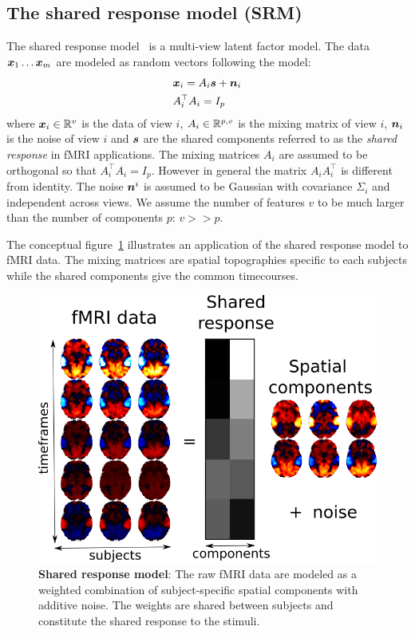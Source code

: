 \subsection{The shared response model (SRM)}
\label{sec:srm:review}
The shared response model~\cite{chen2015reduced} is a multi-view latent factor
model. The data $\boldsymbol{x}_1 \dots \boldsymbol{x}_m$ are modeled as random vectors following the model:
\begin{align}
 &\boldsymbol{x}_i = A_i \boldsymbol{s} + \boldsymbol{n}_i \\
  &A_i^{\top}A_i = I_p
  \label{eq:model:srm}
\end{align}
where $\boldsymbol{x}_i \in \mathbb{R}^v$ is the data of view $i$, $A_i \in \mathbb{R}^{p, v}$ is the
mixing matrix of view $i$, $\boldsymbol{n}_i$ is the noise of view $i$ and $\boldsymbol{s}$ are the
shared components referred to as the \emph{shared response} in fMRI applications.
The mixing matrices
$A_i$ are assumed to be orthogonal so that $A_i^{\top}A_i = I_p$. However in
general the matrix $A_i A_i^{\top}$ is different from identity. The noise
$\boldsymbol{n}^i$ is assumed to be Gaussian with covariance $\Sigma_i$ and independent
across views. We assume the number of features $v$ to be much larger than the
number of components $p$: $v >> p$.

The conceptual figure~\ref{fig:srm:conceptual_figure} illustrates an 
application of the shared response model to fMRI data. The mixing
matrices are spatial topographies specific to each subjects while the shared
components give the common timecourses.

\begin{figure}
  \centering
  \includegraphics[scale=0.3]{figures/srm/conceptual_figure31.png}
  \caption{\textbf{Shared response model}: The raw fMRI data are modeled as a weighted combination of subject-specific spatial components with additive noise. The weights are shared between subjects and constitute the shared response to the stimuli.}
  \label{fig:srm:conceptual_figure}
\end{figure}

